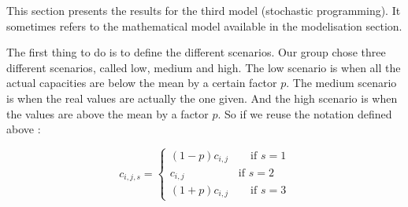 This section presents the results for the third model (stochastic programming). It sometimes refers to the mathematical model available in the modelisation section.

The first thing to do is to define the different scenarios. Our group chose three different scenarios, called low, medium and high. The low scenario is when all the actual capacities are below the mean by a certain factor $p$. The medium scenario is when the real values are actually the one given. And the high scenario is when the values are above the mean by a factor $p$. So if we reuse the notation defined above :

$$c_{i,j,s} = \left\lbrace \begin{array}{c}
(1-p)c_{i,j} \quad\quad \text{if $s=1$}\\ 
c_{i,j} \quad\quad\qquad\:\:\:\: \text{if $s=2$}\\ 
(1+p)c_{i,j} \quad\quad \text{if $s=3$}
\end{array}\right.$$ 